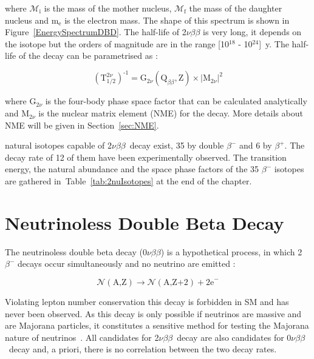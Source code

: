\documentclass[main.tex]{subfiles}
\begin{document}
\NI where $\mathcal{M}_\text{i}$ is the mass of the mother nucleus, $\mathcal{M}_\text{f}$ the mass of the daughter nucleus and m$_\text{e}$ is the electron mass. The shape of this spectrum is shown in Figure~\ref{EnergySpectrumDBD}. The half-life of 2$\nu\beta\beta$ is very long, it depends on the isotope but the orders of magnitude are in the range [10$^{\text{18}}$ - 10$^{\text{24}}$]~y.  The half-life of the decay can be parametrised as : 


\begin{equation}\label{eq:decayRate2nu}
(\text{T}_{\text{1/2}}^{\text{2}\nu})^{\text{-1}} = \text{G}_{\text{2}\nu}(\text{Q}_{\beta\beta}, \text{Z}) \times |\text{M}_{\text{2}\nu}|^\text{2}
\end{equation}


\bigskip


\NI where G$_{\text{2}\nu}$ is the four-body phase space factor that can be calculated analytically and M$_{\text{2}\nu}$ is the nuclear matrix element (NME) for the decay. More details about NME will be given in Section~\ref{sec:NME}.


\bigskip


 natural isotopes capable of 2$\nu\beta\beta$~decay exist, 35 by double $\beta^{-}$ and 6 by $\beta^{+}$. The decay rate of 12 of them have been experimentally observed. The transition energy, the natural abundance and the space phase factors of the 35 $\beta^{-}$ isotopes are gathered in~Table~\ref{tab:2nuIsotopes} at the end of the chapter.



\FloatBarrier


\section{Neutrinoless Double Beta Decay}\label{sec:0NeutrinoDBD}


\NI The neutrinoless double beta decay (0$\nu\beta\beta$) is a hypothetical process, in which 2$\beta^{-}$ decays occur simultaneously and no neutrino are emitted :


\begin{equation}
\mathcal{N} (\text{A,Z}) \rightarrow \mathcal{N} (\text{A,Z+2}) + \text{2e}^- 
\end{equation}


\bigskip


\NI Violating lepton number conservation this decay is forbidden in SM and has never been observed. As this decay is only possible if neutrinos are massive and are Majorana particles, it constitutes a sensitive method for testing the Majorana nature of neutrinos~\cite{RacahNeutrinolessDBDMajorana}. All candidates for 2$\nu\beta\beta$~decay are also candidates for 0$\nu\beta\beta$~decay and, a priori, there is no correlation between the two decay rates. 
\end{document}
